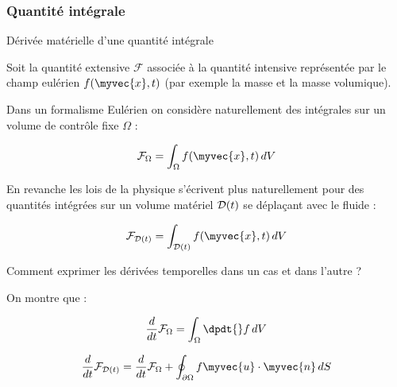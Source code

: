 \subsubsection{Quantité intégrale}
\begin{frame}{Dérivée matérielle d'une quantité intégrale}

\small
Soit la quantité extensive $\mathcal{F}$ associée à la quantité intensive représentée 
par le champ eulérien $f(\myvec{x}, t)$ (par exemple la masse et la masse volumique).

\medskip
\pause 

Dans un formalisme Eulérien on considère naturellement des intégrales sur un \textcolor{vert}{volume de contrôle} fixe $\Omega$ :

$$
 \mathcal{F}_\Omega = \int_\Omega f(\myvec{x}, t)\, dV 
$$

\medskip
\pause

En revanche les lois de la physique s'écrivent plus naturellement pour des quantités intégrées sur un \textcolor{vert}{volume matériel} ${\cal D}(t)$ se déplaçant avec le fluide :
 
$$
 \mathcal{F}_{{\cal D}(t)} = \int_{{\cal D}(t)} f(\myvec{x}, t)\, dV 
$$

\medskip 
\pause

Comment exprimer les dérivées temporelles dans un cas et dans l'autre ?


\medskip 
\pause

On montre que :

$$
\frac{d }{dt} \mathcal{F}_\Omega
=  \int_\Omega \dpdt{} f \, dV
$$

\medskip 
\pause

$$
\frac{d }{dt} \mathcal{F}_{{\cal D}(t)}
=  \frac{d }{dt} \mathcal{F}_\Omega +  \oint_{\partial\Omega} f\myvec{u}\cdot\myvec{n}\, dS
$$





\end{frame}
